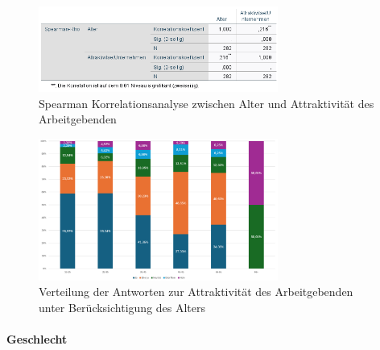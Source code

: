 \begin{figure}[h]
  \centering
  \includegraphics[width=0.7\textwidth]{04_Artefakte/01_Abbildungen/hypothese_5/korrelation_alter.png}
  \caption{Spearman Korrelationsanalyse zwischen Alter und Attraktivität des Arbeitgebenden}
  \label{fig:korrelation_alter}
\end{figure}



\begin{figure}[h]
  \centering
  \includegraphics[width=0.7\textwidth]{04_Artefakte/01_Abbildungen/hypothese_5/attraktivitaet_alter.png}
  \caption{Verteilung der Antworten zur Attraktivität des Arbeitgebenden unter Berücksichtigung des Alters}
  \label{fig:attraktivitaet_alter}
\end{figure}

\paragraph*{Geschlecht}

